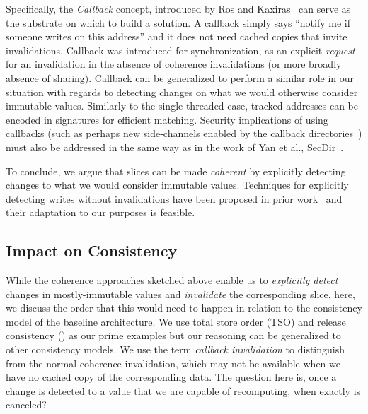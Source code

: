 Specifically, the \emph{Callback} concept, introduced by Ros and Kaxiras~\cite{ros2015callback} can serve as the substrate on which to build a solution. A callback simply says ``notify me if someone writes on this address'' and it does not need cached copies that invite invalidations. Callback was introduced for synchronization, as an explicit \emph{request} for an invalidation in the absence of coherence invalidations (or more broadly absence of sharing). Callback can be generalized to perform a similar role in our situation with regards to detecting changes on what we would otherwise consider immutable values.
Similarly to the single-threaded case, tracked addresses can be encoded in signatures for efficient matching.
Security implications of using callbacks (such as perhaps new side-channels enabled by the callback directories~\cite{ros2016racer}) must also be addressed in the same way as in the work of Yan et al., SecDir~\cite{yan2019secdir}.

To conclude, we argue that {\recomp} slices can be made \emph{coherent} by explicitly detecting changes to what we would consider immutable values. Techniques for explicitly detecting writes without invalidations have been proposed in prior work~\cite{ros2016racer,ros2015callback} and their adaptation to our purposes is feasible.

\subsection{Impact on Consistency}
\label{sec:consistency}
While the coherence approaches sketched above enable us to \emph{explicitly detect} changes in mostly-immutable values and \emph{invalidate} the corresponding {\recomp} slice, here, we discuss the order that this would need to happen in relation to the consistency model of the baseline architecture.
We use total store order (TSO) and release consistency ({\rc}) as our prime examples but our reasoning can be generalized to other consistency models. 
We use the term \emph{callback invalidation} to distinguish from the normal coherence invalidation, which may not be available when we have no cached copy of the corresponding data.
The question here is, once a change is detected to a value that we are capable of recomputing, when exactly is {\recomp} canceled? 

